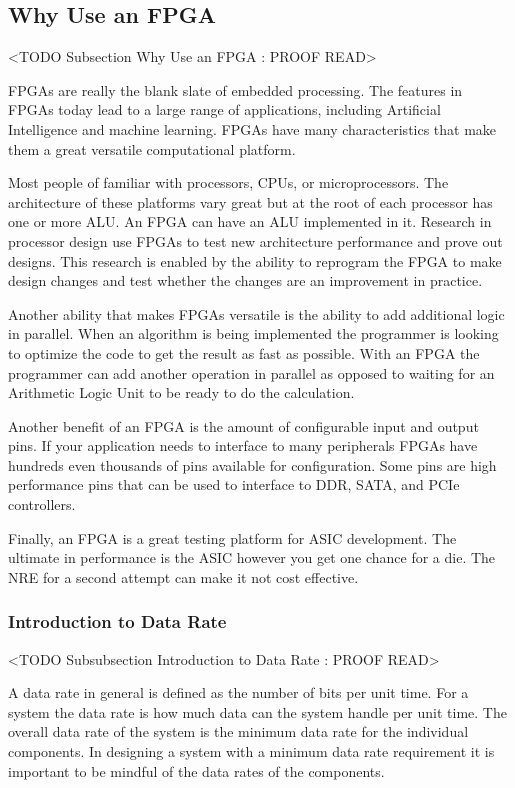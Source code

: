 \subsection{Why Use an FPGA}
	<TODO Subsection Why Use an FPGA : PROOF READ>
	
FPGAs are really the blank slate of embedded processing. The features in FPGAs today lead to a large range of applications, including Artificial Intelligence and machine learning. FPGAs have many characteristics that make them a great versatile computational platform. 

Most people of familiar with processors, CPUs, or microprocessors. The architecture of these platforms vary great but at the root of each processor has one or more ALU. An FPGA can have an ALU implemented in it. Research in processor design use FPGAs to test new architecture performance and prove out designs. This research is enabled by the ability to reprogram the FPGA to make design changes and test whether the changes are an improvement in practice. 

Another ability that makes FPGAs versatile is the ability to add additional logic in parallel. When an algorithm is being implemented the programmer is looking to optimize the code to get the result as fast as possible. With an FPGA the programmer can add another operation in parallel as opposed to waiting for an Arithmetic Logic Unit to be ready to do the calculation. 

Another benefit of an FPGA is the amount of configurable input and output pins. If your application needs to interface to many peripherals FPGAs have hundreds even thousands of pins available for configuration. Some pins are high performance pins that can be used to interface to DDR, SATA, and PCIe controllers. 

Finally, an FPGA is a great testing platform for ASIC development. The ultimate in performance is the ASIC however you get one chance for a die. The NRE for a second attempt can make it not cost effective.

\subsubsection{Introduction to Data Rate}
	<TODO Subsubsection  Introduction to Data Rate : PROOF READ>

A data rate in general is defined as the number of bits per unit time. For a system the data rate is how much data can the system handle per unit time. The overall data rate of the system is the minimum data rate for the individual components. In designing a system with a minimum data rate requirement it is important to be mindful of the data rates of the components.

